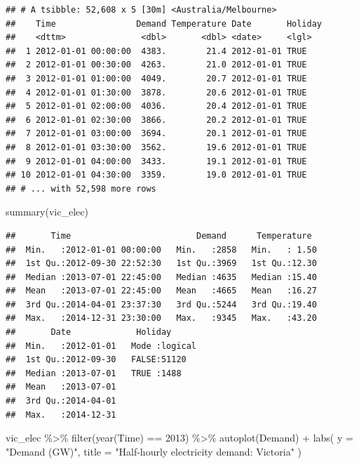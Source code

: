 \documentclass[
]{book}
\newenvironment{Shaded}{\begin{snugshade}}{\end{snugshade}}
\newcommand{\AttributeTok}[1]{\textcolor[rgb]{0.77,0.63,0.00}{#1}}
\newcommand{\DecValTok}[1]{\textcolor[rgb]{0.00,0.00,0.81}{#1}}
\newcommand{\FunctionTok}[1]{\textcolor[rgb]{0.00,0.00,0.00}{#1}}
\newcommand{\NormalTok}[1]{#1}
\newcommand{\SpecialCharTok}[1]{\textcolor[rgb]{0.00,0.00,0.00}{#1}}
\newcommand{\StringTok}[1]{\textcolor[rgb]{0.31,0.60,0.02}{#1}}
\begin{document}
\begin{verbatim}
## # A tsibble: 52,608 x 5 [30m] <Australia/Melbourne>
##    Time                Demand Temperature Date       Holiday
##    <dttm>               <dbl>       <dbl> <date>     <lgl>  
##  1 2012-01-01 00:00:00  4383.        21.4 2012-01-01 TRUE   
##  2 2012-01-01 00:30:00  4263.        21.0 2012-01-01 TRUE   
##  3 2012-01-01 01:00:00  4049.        20.7 2012-01-01 TRUE   
##  4 2012-01-01 01:30:00  3878.        20.6 2012-01-01 TRUE   
##  5 2012-01-01 02:00:00  4036.        20.4 2012-01-01 TRUE   
##  6 2012-01-01 02:30:00  3866.        20.2 2012-01-01 TRUE   
##  7 2012-01-01 03:00:00  3694.        20.1 2012-01-01 TRUE   
##  8 2012-01-01 03:30:00  3562.        19.6 2012-01-01 TRUE   
##  9 2012-01-01 04:00:00  3433.        19.1 2012-01-01 TRUE   
## 10 2012-01-01 04:30:00  3359.        19.0 2012-01-01 TRUE   
## # ... with 52,598 more rows
\end{verbatim}

\begin{Shaded}
\begin{Highlighting}[]
\FunctionTok{summary}\NormalTok{(vic\_elec)}
\end{Highlighting}
\end{Shaded}

\begin{verbatim}
##       Time                         Demand      Temperature   
##  Min.   :2012-01-01 00:00:00   Min.   :2858   Min.   : 1.50  
##  1st Qu.:2012-09-30 22:52:30   1st Qu.:3969   1st Qu.:12.30  
##  Median :2013-07-01 22:45:00   Median :4635   Median :15.40  
##  Mean   :2013-07-01 22:45:00   Mean   :4665   Mean   :16.27  
##  3rd Qu.:2014-04-01 23:37:30   3rd Qu.:5244   3rd Qu.:19.40  
##  Max.   :2014-12-31 23:30:00   Max.   :9345   Max.   :43.20  
##       Date             Holiday       
##  Min.   :2012-01-01   Mode :logical  
##  1st Qu.:2012-09-30   FALSE:51120    
##  Median :2013-07-01   TRUE :1488     
##  Mean   :2013-07-01                  
##  3rd Qu.:2014-04-01                  
##  Max.   :2014-12-31
\end{verbatim}

\begin{Shaded}
\begin{Highlighting}[]
\NormalTok{vic\_elec }\SpecialCharTok{\%\textgreater{}\%}
  \FunctionTok{filter}\NormalTok{(}\FunctionTok{year}\NormalTok{(Time) }\SpecialCharTok{==} \DecValTok{2013}\NormalTok{) }\SpecialCharTok{\%\textgreater{}\%}
  \FunctionTok{autoplot}\NormalTok{(Demand) }\SpecialCharTok{+}
  \FunctionTok{labs}\NormalTok{(}
    \AttributeTok{y =} \StringTok{"Demand (GW)"}\NormalTok{,}
    \AttributeTok{title =} \StringTok{"Half{-}hourly electricity demand: Victoria"}
\NormalTok{  )}
\end{Highlighting}
\end{Shaded}
\end{document}
